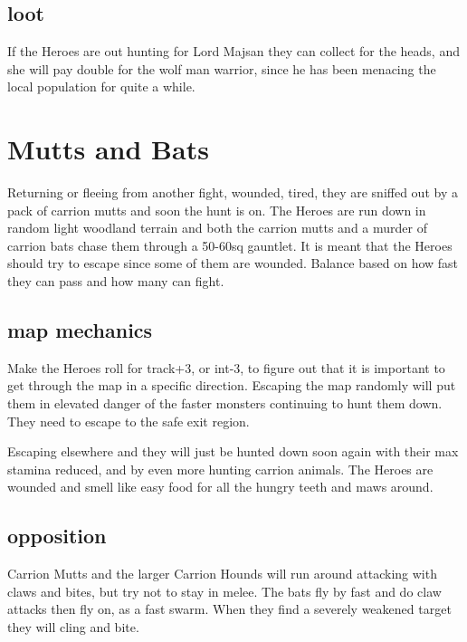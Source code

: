 \subsection*{loot}
If the Heroes are out hunting for Lord Majsan they can collect for the heads, and she will pay double for the wolf man warrior, since he has been menacing the local population for quite a while.







\section*{Mutts and Bats}
Returning or fleeing from another fight, wounded, tired, they are sniffed out by a pack of carrion mutts and soon the hunt is on. The Heroes are run down in random light woodland terrain and both the carrion mutts and a murder of carrion bats chase them through a 50-60sq gauntlet.
It is meant that the Heroes should try to escape since some of them are wounded. Balance based on how fast they can pass and how many can fight.


\subsection*{map mechanics}
Make the Heroes roll for track+3, or int-3, to figure out that it is important to get through the map in a specific direction. Escaping the map randomly will put them in elevated danger of the faster monsters continuing to hunt them down. They need to escape to the safe exit region.

Escaping elsewhere and they will just be hunted down soon again with their max stamina reduced, and by even more hunting carrion animals. The Heroes are wounded and smell like easy food for all the hungry teeth and maws around.


\subsection*{opposition}
Carrion Mutts and the larger Carrion Hounds will run around attacking with claws and bites, but try not to stay in melee. The bats fly by fast and do claw attacks then fly on, as a fast swarm. When they find a severely weakened target they will cling and bite.


